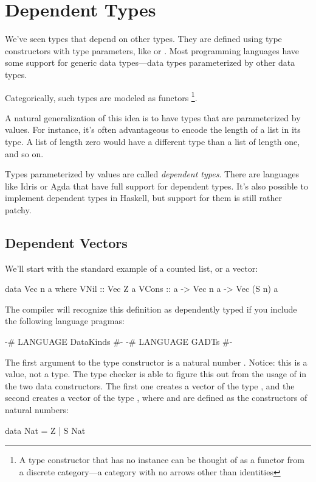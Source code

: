 \documentclass[DaoFP]{subfiles}
\begin{document}
\setcounter{chapter}{10}

\chapter{Dependent Types}

We've seen types that depend on other types. They are defined using type constructors with type parameters, like  or \hask{[]}. Most programming languages have some support for generic data types---data types parameterized by other data types.

Categorically, such types are modeled as functors \footnote{A type constructor that has no  instance can be thought of as a functor from a discrete category---a category with no arrows other than identities}.

A natural generalization of this idea is to have types that are parameterized by values. For instance, it's often advantageous to encode the length of a list in its type. A list of length zero would have a different type than a list of length one, and so on. 

Types parameterized by values are called \emph{dependent types}. There are languages like Idris or Agda that have full support for dependent types. It's also possible to implement dependent types in Haskell, but support for them is still rather patchy.

\section{Dependent Vectors}

We'll start with the standard example of a counted list, or a vector:
\begin{haskell}
data Vec n a where
    VNil  :: Vec Z a
    VCons :: a -> Vec n a -> Vec (S n) a
\end{haskell}
The compiler will recognize this definition as dependently typed if you include the following language pragmas:
\begin{haskell}
{-# LANGUAGE DataKinds #-}
{-# LANGUAGE GADTs #-}
\end{haskell}
The first argument to the type constructor is a natural number . Notice: this is a value, not a type. The type checker is able to figure this out from the usage of  in the two data constructors. The first one creates a vector of the type , and the second creates a vector of the type , where  and  are defined as the constructors of natural numbers:
\begin{haskell}
data Nat = Z | S Nat
\end{haskell}
\end{document}
